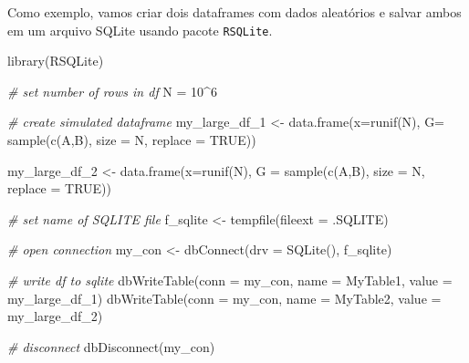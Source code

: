 \documentclass[
  11pt,
]{book}
\newenvironment{Shaded}{\begin{snugshade}}{\end{snugshade}}
\newcommand{\AttributeTok}[1]{\textcolor[rgb]{0.61,0.61,0.61}{#1}}
\newcommand{\CommentTok}[1]{\textcolor[rgb]{0.37,0.37,0.37}{\textit{#1}}}
\newcommand{\ConstantTok}[1]{\textcolor[rgb]{0,0,0}{#1}}
\newcommand{\DecValTok}[1]{\textcolor[rgb]{0.06,0.06,0.06}{#1}}
\newcommand{\FunctionTok}[1]{\textcolor[rgb]{0,0,0}{#1}}
\newcommand{\NormalTok}[1]{#1}
\newcommand{\OtherTok}[1]{\textcolor[rgb]{0.37,0.37,0.37}{#1}}
\newcommand{\SpecialCharTok}[1]{\textcolor[rgb]{0,0,0}{#1}}
\newcommand{\StringTok}[1]{\textcolor[rgb]{0.5,0.5,0.5}{#1}}
\begin{document}
Como exemplo, vamos criar dois dataframes com dados aleatórios e salvar ambos em um arquivo SQLite usando pacote \texttt{RSQLite}. 

\begin{Shaded}
\begin{Highlighting}[]
\FunctionTok{library}\NormalTok{(RSQLite)}

\CommentTok{\# set number of rows in df}
\NormalTok{N }\OtherTok{=} \DecValTok{10}\SpecialCharTok{\^{}}\DecValTok{6} 

\CommentTok{\# create simulated dataframe}
\NormalTok{my\_large\_df\_1 }\OtherTok{\textless{}{-}} \FunctionTok{data.frame}\NormalTok{(}\AttributeTok{x=}\FunctionTok{runif}\NormalTok{(N), }
                            \AttributeTok{G=} \FunctionTok{sample}\NormalTok{(}\FunctionTok{c}\NormalTok{(}\StringTok{\textquotesingle{}A\textquotesingle{}}\NormalTok{,}\StringTok{\textquotesingle{}B\textquotesingle{}}\NormalTok{),}
                                      \AttributeTok{size =}\NormalTok{ N,}
                                      \AttributeTok{replace =} \ConstantTok{TRUE}\NormalTok{))}

\NormalTok{my\_large\_df\_2 }\OtherTok{\textless{}{-}} \FunctionTok{data.frame}\NormalTok{(}\AttributeTok{x=}\FunctionTok{runif}\NormalTok{(N), }
                            \AttributeTok{G =} \FunctionTok{sample}\NormalTok{(}\FunctionTok{c}\NormalTok{(}\StringTok{\textquotesingle{}A\textquotesingle{}}\NormalTok{,}\StringTok{\textquotesingle{}B\textquotesingle{}}\NormalTok{),}
                                       \AttributeTok{size =}\NormalTok{ N,}
                                       \AttributeTok{replace =} \ConstantTok{TRUE}\NormalTok{))}

\CommentTok{\# set name of SQLITE file}
\NormalTok{f\_sqlite }\OtherTok{\textless{}{-}} \FunctionTok{tempfile}\NormalTok{(}\AttributeTok{fileext =} \StringTok{\textquotesingle{}.SQLITE\textquotesingle{}}\NormalTok{)}

\CommentTok{\# open connection}
\NormalTok{my\_con }\OtherTok{\textless{}{-}} \FunctionTok{dbConnect}\NormalTok{(}\AttributeTok{drv =} \FunctionTok{SQLite}\NormalTok{(), f\_sqlite)}

\CommentTok{\# write df to sqlite}
\FunctionTok{dbWriteTable}\NormalTok{(}\AttributeTok{conn =}\NormalTok{ my\_con, }\AttributeTok{name =} \StringTok{\textquotesingle{}MyTable1\textquotesingle{}}\NormalTok{, }
             \AttributeTok{value =}\NormalTok{ my\_large\_df\_1)}
\FunctionTok{dbWriteTable}\NormalTok{(}\AttributeTok{conn =}\NormalTok{ my\_con, }\AttributeTok{name =} \StringTok{\textquotesingle{}MyTable2\textquotesingle{}}\NormalTok{, }
             \AttributeTok{value =}\NormalTok{ my\_large\_df\_2)}

\CommentTok{\# disconnect}
\FunctionTok{dbDisconnect}\NormalTok{(my\_con)}
\end{Highlighting}
\end{Shaded}
\end{document}
